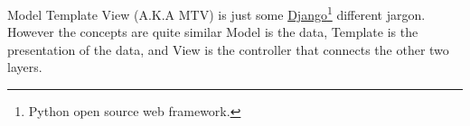 Model Template View (A.K.A MTV) is just some \href{https://www.djangoproject.com}{Django}\footnote{Python open source web framework.} different jargon\cite{mtv}. However the concepts are quite similar Model is the data, Template is the presentation of the data, and View is the controller that connects the other two layers.
